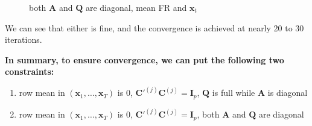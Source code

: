 \documentclass[]{article}
\begin{document}
\begin{figure}[h!]
	\caption{both \(\mathbf{A}\) and \(\mathbf{Q}\) are diagonal, mean FR and $\mathbf{x}_t$}
	\label{FR and X, diag AQ}
\end{figure}

We can see that either is fine, and the convergence is achieved at nearly 20 to 30 iterations.

\textbf{In summary, to ensure convergence, we can put the following two constraints:}
\begin{enumerate}
	\def\labelenumi{(\arabic{enumi})}
	\item
	row mean in \((\mathbf{x}_{1},\ldots,\mathbf{x}_{T})\) is 0,
	\(\mathbf{C}'^{(j)}\mathbf{C}^{(j)} = \mathbf{I}_{p}\), \(\mathbf{Q}\) is full while \(\mathbf{A}\) is
	diagonal
	\item
	row mean in \((\mathbf{x}_{1},\ldots,\mathbf{x}_{T})\) is 0,
	\(\mathbf{C}'^{(j)}\mathbf{C}^{(j)} = \mathbf{I}_{p}\), both \(\mathbf{A}\) and \(\mathbf{Q}\) are diagonal
\end{enumerate}
\end{document}
